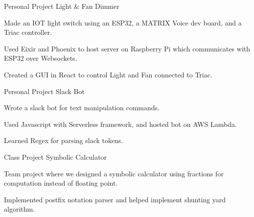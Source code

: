 

\begin{cventries}

\cventry
{Personal Project} %
{Light \& Fan Dimmer} %
{} %
{} %
{
  \begin{cvitems} %
    \item {Made an IOT light switch using an ESP32, a MATRIX Voice dev board, and a Triac controller.}
    \item {Used Eixir and Phoenix to host server on Raspberry Pi which communicates with ESP32 over Websockets.}
    \item {Created a GUI in React to control Light and Fan connected to Triac.}
  \end{cvitems}
}


  \cventry
    {Personal Project} %
    {Slack Bot} %
    {} %
    {} %
    {
      \begin{cvitems} %
        \item {Wrote a slack bot for text manipulation commands.}
        \item {Used Javascript with Serverless framework, and hosted bot on AWS Lambda.}
        \item {Learned Regex for parsing slack tokens.}
      \end{cvitems}
    }


  \cventry
    {Class Project} %
    {Symbolic Calculator} %
    {} %
    {} %
    {
      \begin{cvitems} %
        \item {Team project where we designed a symbolic calculator using fractions for computation instead of floating point.}
        \item {Implemented postfix notation parser and helped implement shunting yard algorithm.}
      \end{cvitems}
    }

\end{cventries}